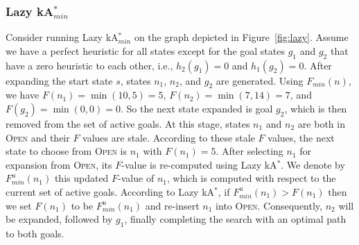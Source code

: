 \documentclass{aicom2e}
\newcommand{\kastar}{kA$^*$}
\newcommand{\kastarmin}{kA$^*_{min}$}
\newcommand{\minf}{$F_{min}(n)$}
\newcommand{\open}{\textsc{Open}}
\newcommand{\roni}[1]{\textbf{[RS:#1]}}
\begin{document}
\subsubsection{Lazy \kastarmin{}}

Consider running Lazy \kastarmin{} on the graph depicted in
Figure~\ref{fig:lazy}. Assume we have a perfect heuristic for all states except
for the goal states $g_1$ and $g_2$ that have a zero heuristic to each other,
i.e., $h_2(g_1)=0$ and $h_1(g_2)=0$.
After expanding the start state $s$, states $n_1$, $n_2$, and
$g_2$ are generated. Using \minf{}, we have $F(n_1)=\min(10,5)=5$,
$F(n_2)=\min(7,14)=7$, and $F(g_2)=\min(0,0)=0$. So the next state expanded is
goal $g_2$, which is then removed from the set of active goals. At this stage,
states $n_1$ and $n_2$ are both in \open{} and their $F$ values are stale.
According to these stale $F$ values, the next state to
choose from \open{} is $n_1$ with $F(n_1)=5$. After selecting $n_1$ for expansion from
\open{}, its $F$-value is re-computed using Lazy \kastar{}. We denote
by $F^u_{min}(n_1)$ this updated $F$-value of $n_1$, which is computed with respect
to the current set of active goals. According to Lazy \kastar{}, if
$F^u_{min}(n_1)> F(n_1)$ then we set $F(n_1)$ to be $F^u_{min}(n_1)$ and re-insert
$n_1$ into \open{}. Consequently, $n_2$ will be expanded, followed by $g_1$,
finally completing the search with an optimal path to both goals. %
\end{document}
